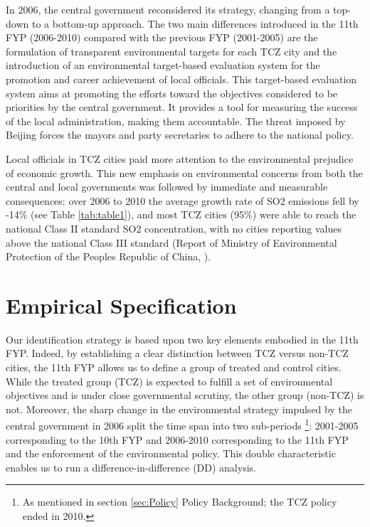 \documentclass[12pt]{article}
\begin{document}
In 2006, the central government reconsidered its strategy, changing from a top-down to a bottom-up approach. The two main differences introduced in the 11th FYP (2006-2010) compared with the previous FYP (2001-2005) are the formulation of transparent environmental targets for each TCZ city and the introduction of an environmental target-based evaluation system for the promotion and career achievement of local officials. This target-based evaluation system aims at promoting the efforts toward the objectives considered to be priorities by the central government. It provides a tool for measuring the success of the local administration, making them accountable. The threat imposed by Beijing forces the mayors and party secretaries to adhere to the national policy. 

Local officials in TCZ cities paid more attention to the environmental prejudice of economic growth. This new emphasis on environmental concerns from both the central and local governments was followed by immediate and measurable consequences: over 2006 to 2010 the average growth rate of SO2 emissions fell by -14\% (see Table \ref{tab:table1}), and most TCZ cities (95\%) were able to reach the national Class II standard SO2 concentration, with no cities reporting values above the national Class III standard (Report of Ministry of Environmental Protection of the Peoples Republic of China, \citeyear{Ministry_of_Environmental_Protection_of_the_Peoples_Republic_of_China2011-oi}).

\section{Empirical Specification} \label{sec:empirical}

Our identification strategy is based upon two key elements embodied in the 11th FYP. Indeed, by establishing a clear distinction between TCZ versus non-TCZ cities, the 11th FYP allows us to define a group of treated and control cities. While the treated group (TCZ) is expected to fulfill a set of environmental objectives and is under close governmental scrutiny, the other group (non-TCZ) is not. Moreover, the sharp change in the environmental strategy impulsed by the central government in 2006 split the time span into two sub-periods \footnote{As mentioned in section \ref{sec:Policy} Policy Background; the TCZ policy ended in 2010.}: 2001-2005 corresponding to the 10th FYP and 2006-2010 corresponding to the 11th FYP and the enforcement of the environmental policy. This double characteristic enables us to run a difference-in-difference (DD) analysis.
\end{document}
